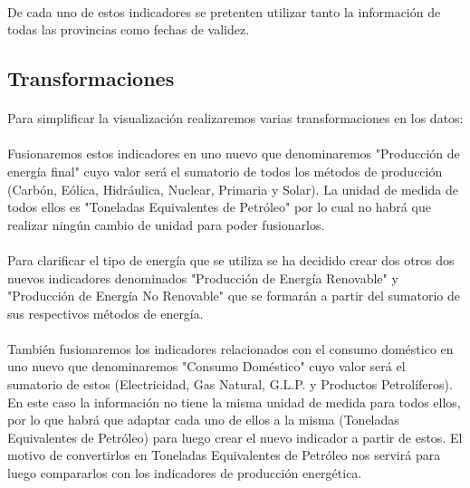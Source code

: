 \documentclass[11pt,spanish]{article}
\begin{document}
			\paragraph{}
			De cada uno de estos indicadores se pretenten utilizar tanto la información de todas las provincias como fechas de validez.

		\subsection{Transformaciones}

			\paragraph{}
			Para simplificar la visualización realizaremos varias transformaciones en los datos:

			\paragraph{}
			Fusionaremos estos indicadores en uno nuevo que denominaremos "Producción de energía final" cuyo valor será el sumatorio de todos los métodos de producción (Carbón, Eólica, Hidráulica, Nuclear, Primaria y Solar). La unidad de medida de todos ellos es "Toneladas Equivalentes de Petróleo" por lo cual no habrá que realizar ningún cambio de unidad para poder fusionarlos.

			\paragraph{}
			Para clarificar el tipo de energía que se utiliza se ha decidido crear dos otros dos nuevos indicadores denominados "Producción de Energía Renovable" y "Producción de Energía No Renovable" que se formarán a partir del sumatorio de sus respectivos métodos de energía.

			\paragraph{}
			 También fusionaremos los indicadores relacionados con el consumo doméstico en uno nuevo que  denominaremos  "Consumo Doméstico" cuyo valor será el sumatorio de estos (Electricidad, Gas Natural, G.L.P. y Productos Petrolíferos). En este caso la información no tiene la misma unidad de medida para todos ellos, por lo que habrá que adaptar cada uno de ellos a la misma (Toneladas Equivalentes de Petróleo) para luego crear el nuevo indicador a partir de estos. El motivo de convertirlos en Toneladas Equivalentes de Petróleo nos servirá para luego compararlos con los indicadores de  producción energética.
			 
\end{document}
